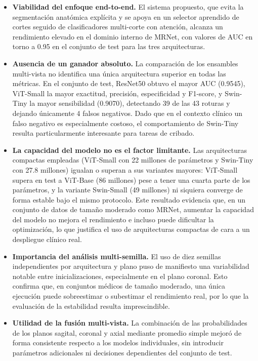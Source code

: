 \begin{itemize}
    \item \textbf{Viabilidad del enfoque end-to-end.} El sistema propuesto, que evita la segmentación anatómica explícita y se apoya en un selector aprendido de cortes seguido de clasificadores multi-corte con atención, alcanza un rendimiento elevado en el dominio interno de MRNet, con valores de AUC en torno a 0.95 en el conjunto de test para las tres arquitecturas.

    \item \textbf{Ausencia de un ganador absoluto.} La comparación de los ensambles multi-vista no identifica una única arquitectura superior en todas las métricas. En el conjunto de test, ResNet50 obtuvo el mayor AUC (0.9545), ViT-Small la mayor exactitud, precisión, especificidad y F1-score, y Swin-Tiny la mayor sensibilidad (0.9070), detectando 39 de las 43 roturas y dejando únicamente 4 falsos negativos. Dado que en el contexto clínico un falso negativo es especialmente costoso, el comportamiento de Swin-Tiny resulta particularmente interesante para tareas de cribado.

    \item \textbf{La capacidad del modelo no es el factor limitante.} Las arquitecturas compactas empleadas (ViT-Small con 22 millones de parámetros y Swin-Tiny con 27.8 millones) igualan o superan a sus variantes mayores: ViT-Small supera en test a ViT-Base (86 millones) pese a tener una cuarta parte de los parámetros, y la variante Swin-Small (49 millones) ni siquiera converge de forma estable bajo el mismo protocolo. Este resultado evidencia que, en un conjunto de datos de tamaño moderado como MRNet, aumentar la capacidad del modelo no mejora el rendimiento e incluso puede dificultar la optimización, lo que justifica el uso de arquitecturas compactas de cara a un despliegue clínico real.

    \item \textbf{Importancia del análisis multi-semilla.} El uso de diez semillas independientes por arquitectura y plano puso de manifiesto una variabilidad notable entre inicializaciones, especialmente en el plano coronal. Esto confirma que, en conjuntos médicos de tamaño moderado, una única ejecución puede sobreestimar o subestimar el rendimiento real, por lo que la evaluación de la estabilidad resulta imprescindible.

    \item \textbf{Utilidad de la fusión multi-vista.} La combinación de las probabilidades de los planos sagital, coronal y axial mediante promedio simple mejoró de forma consistente respecto a los modelos individuales, sin introducir parámetros adicionales ni decisiones dependientes del conjunto de test.


\end{itemize}
